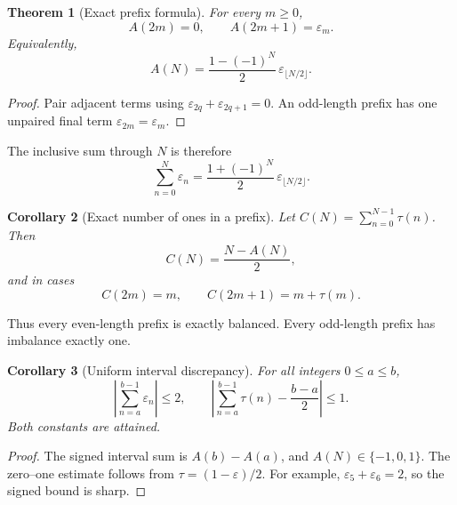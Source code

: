 \documentclass[11pt,oneside]{article}
\newtheorem{theorem}{Theorem}[section]
\newtheorem{corollary}[theorem]{Corollary}
\theoremstyle{definition}
\theoremstyle{remark}
\begin{document}
\begin{theorem}[Exact prefix formula]
\label{thm:exact-prefix}
For every \(m\ge0\),
\begin{equation}
 A(2m)=0,
 \qquad
 A(2m+1)=\varepsilon_m.
 \label{eq:prefix-cases}
\end{equation}
Equivalently,
\begin{equation}
 \boxed{\quad
 A(N)=\frac{1-(-1)^N}{2}\,\varepsilon_{\lfloor N/2\rfloor}.
 \quad}
 \label{eq:prefix-compact}
\end{equation}
\end{theorem}

\begin{proof}
Pair adjacent terms using
\(\varepsilon_{2q}+\varepsilon_{2q+1}=0\).  An odd-length prefix has one
unpaired final term \(\varepsilon_{2m}=\varepsilon_m\).
\end{proof}

The inclusive sum through \(N\) is therefore
\begin{equation}
 \sum_{n=0}^{N}\varepsilon_n
 =\frac{1+(-1)^N}{2}\,\varepsilon_{\lfloor N/2\rfloor}.
 \label{eq:inclusive-prefix}
\end{equation}

\begin{corollary}[Exact number of ones in a prefix]
\label{cor:prefix-ones}
Let \(C(N)=\sum_{n=0}^{N-1}\tau(n)\).  Then
\begin{equation}
 C(N)=\frac{N-A(N)}{2},
 \label{eq:C-from-A}
\end{equation}
and in cases
\begin{equation}
 C(2m)=m,
 \qquad
 C(2m+1)=m+\tau(m).
 \label{eq:prefix-one-cases}
\end{equation}
\end{corollary}

Thus every even-length prefix is exactly balanced.  Every odd-length prefix
has imbalance exactly one.

\begin{corollary}[Uniform interval discrepancy]
\label{cor:interval-discrepancy}
For all integers \(0\le a\le b\),
\begin{equation}
 \left|\sum_{n=a}^{b-1}\varepsilon_n\right|\le2,
 \qquad
 \left|\sum_{n=a}^{b-1}\tau(n)-\frac{b-a}{2}\right|\le1.
 \label{eq:interval-discrepancy}
\end{equation}
Both constants are attained.
\end{corollary}

\begin{proof}
The signed interval sum is \(A(b)-A(a)\), and
\(A(N)\in\{-1,0,1\}\).  The zero--one estimate follows from
\(\tau=(1-\varepsilon)/2\).  For example,
\(\varepsilon_5+\varepsilon_6=2\), so the signed bound is sharp.
\end{proof}
\end{document}
